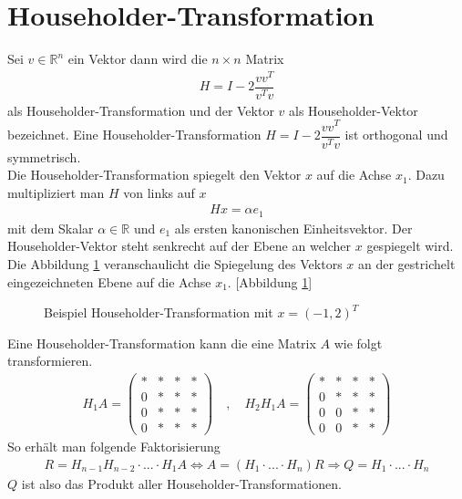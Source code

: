 \section{Householder-Transformation}
Sei  $v \in \mathbb{R}^n$ ein Vektor dann wird die $n \times n$ Matrix 
\begin{align}
	H = I - 2 \dfrac{vv^T}{v^Tv}
\end{align}
als Householder-Transformation und der Vektor $v$ als Householder-Vektor bezeichnet.
Eine Householder-Transformation $H = I - 2 \dfrac{vv^T}{v^Tv}$ ist orthogonal und symmetrisch. \cite{num1}\\
Die Householder-Transformation spiegelt den Vektor $x$ auf die Achse $x_1$.
Dazu multipliziert man $H$ von links auf $x$
\begin{align}
	Hx=\alpha e_1 \label{spiegelung}
\end{align}
mit dem Skalar $\alpha \in \mathbb{R}$ und $e_1$ als ersten kanonischen Einheitsvektor. Der Householder-Vektor steht senkrecht auf der Ebene an welcher $x$ gespiegelt wird.\\
Die Abbildung \ref{fig:HHolder} veranschaulicht die Spiegelung des Vektors $x$ an der gestrichelt eingezeichneten Ebene auf die Achse $x_1$.
[Abbildung \ref{fig:HHolder}]
\begin{figure}[H]
	\centering
	
	\caption{Beispiel Householder-Transformation mit $x=(-1,2)^T$}
	\label{fig:HHolder}
\end{figure}

Eine Householder-Transformation kann die eine Matrix $A$ wie folgt transformieren.
\begin{align*}
	H_1 A= \left( 
	\begin{array}{cccc}
	* & * & * & * \\ 
	0 & * & * & * \\ 
	0 & * & * & * \\ 
	0 & * & * & *
	\end{array}
	\right)
	\quad , \quad
	H_2 H_1 A= \left( 
	\begin{array}{cccc}
	* & * & * & * \\ 
	0 & * & * & * \\ 
	0 & 0 & * & * \\ 
	0 & 0 & * & *
	\end{array}
	\right)
\end{align*} 
So erhält man folgende Faktorisierung
\begin{align*}
	R = H_{n-1} H_{n-2}\cdot ...\cdot H_1 A \Leftrightarrow A = (H_1\cdot ...\cdot H_n)R \Rightarrow Q = H_1\cdot ... \cdot H_n
\end{align*}
$Q$ ist also das Produkt aller Householder-Transformationen.


